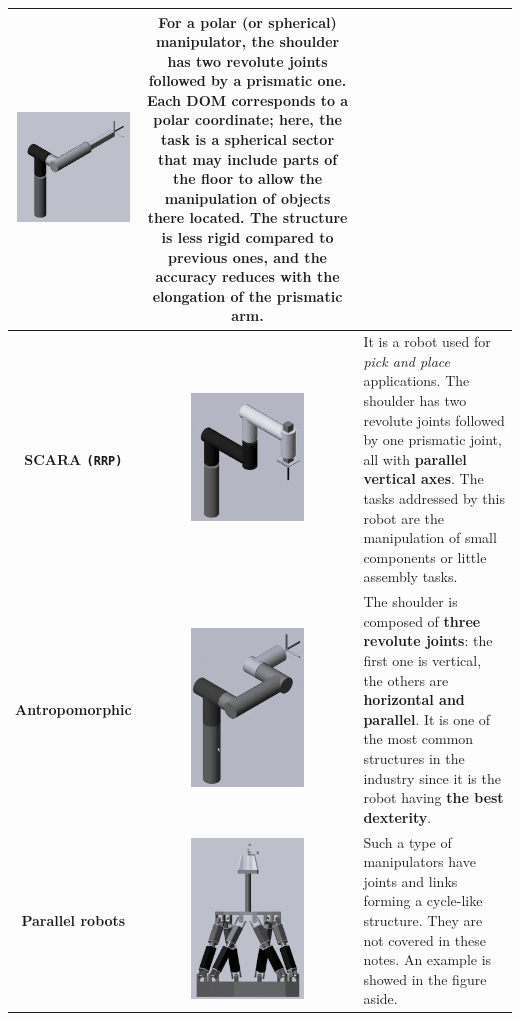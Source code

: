 \begin{longtable}{c c m{8cm}}
    \includegraphics[width=3cm]{img/spherical_man.png} & 
    For a \textbf{polar (or spherical) manipulator}, the shoulder has two revolute joints followed by a prismatic one. Each DOM corresponds to a polar coordinate; here, the task is a spherical sector that may include parts of the floor to allow the manipulation of objects there located. The structure is less rigid compared to previous ones, and the accuracy reduces with the elongation of the prismatic arm. \\
\hline
    \textbf{SCARA \texttt{(RRP)}} & 
    \includegraphics[width=3cm]{img/scara.png} & 
    It is a robot used for \textit{pick and place} applications. The shoulder has two revolute joints followed by one prismatic joint, all with \textbf{parallel vertical axes}. The tasks addressed by this robot are the manipulation of small components or little assembly tasks. \\
\hline
    \textbf{Antropomorphic} & 
    \includegraphics[width=3cm]{img/antrop_man.png} & 
    The shoulder is composed of \textbf{three revolute joints}: the first one is vertical, the others are \textbf{horizontal and parallel}. It is one of the most common structures in the industry since it is the robot having \textbf{the best dexterity}. \\
\hline
    \textbf{Parallel robots}&{
        \includegraphics[width=3cm]{img/parallel_man.png}
    }&{
        Such a type of manipulators have joints and links forming a cycle-like structure. They are not covered in these notes. An example is showed in the figure aside.
    }\\
    
\end{longtable}
